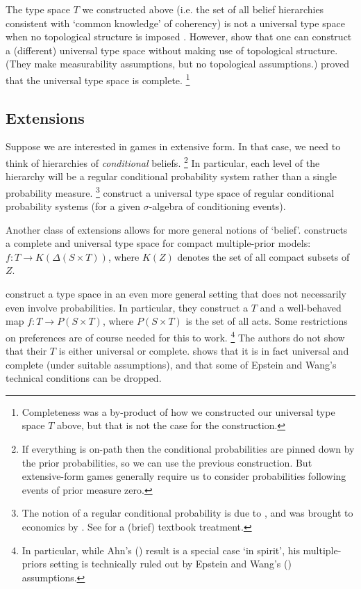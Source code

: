 \documentclass[11pt,letterpaper,reqno,oneside]{article}
\begin{document}
The type space $T$ we constructed above (i.e. the set of all belief hierarchies consistent with `common knowledge' of coherency) is not a universal type space when no topological structure is imposed \parencite{HeifetzSamet1999}. However, \textcite{HeifetzSamet1998} show that one can construct a (different) universal type space without making use of topological structure. (They make measurability assumptions, but no topological assumptions.) \textcite{Meier2012} proved that the \textcite{HeifetzSamet1998} universal type space is complete.%
	\footnote{Completeness was a by-product of how we constructed our universal type space $T$ above, but that is not the case for the \textcite{HeifetzSamet1998} construction.}



\subsection{Extensions}
\label{sec:belief_hierarchies:extensions}

Suppose we are interested in games in extensive form. In that case, we need to think of hierarchies of \emph{conditional} beliefs.%
	\footnote{If everything is on-path then the conditional probabilities are pinned down by the prior probabilities, so we can use the previous construction. But extensive-form games generally require us to consider probabilities following events of prior measure zero.}
In particular, each level of the hierarchy will be a regular conditional probability system rather than a single probability measure.%
	\footnote{The notion of a regular conditional probability is due to \textcite{Renyi1955}, and was brought to economics by \textcite{Myerson1986}. See \textcite[][sec. 1.6]{Myerson1991} for a (brief) textbook treatment.}
\textcite{BattigalliSiniscalchi1999} construct a universal type space of regular conditional probability systems (for a given $\sigma$-algebra of conditioning events).

Another class of extensions allows for more general notions of `belief'. \textcite{Ahn2007} constructs a complete and universal type space for compact multiple-prior models: $f : T \to K( \Delta( S \times T) )$, where $K(Z)$ denotes the set of all compact subsets of $Z$.

\textcite{EpsteinWang1996} construct a type space in an even more general setting that does not necessarily even involve probabilities. In particular, they construct a $T$ and a well-behaved map $f : T \to P(S \times T)$, where $P(S \times T)$ is the set of all acts. Some restrictions on preferences are of course needed for this to work.%
	\footnote{In particular, while Ahn's (\citeyear{Ahn2007}) result is a special case `in spirit', his multiple-priors setting is technically ruled out by Epstein and Wang's (\citeyear{EpsteinWang1996}) assumptions.}
The authors do not show that their $T$ is either universal or complete. \textcite{Chen2010} shows that it is in fact universal and complete (under suitable assumptions), and that some of Epstein and Wang's technical conditions can be dropped.
\end{document}
